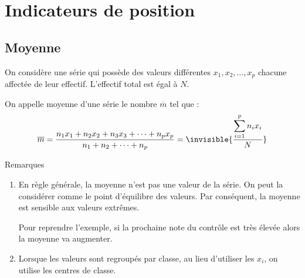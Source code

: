 \documentclass[xcolor={dvipsnames,svgnames,table}]{beamer}
\begin{document}
\section{Indicateurs de position}
\subsection{Moyenne}

\begin{frame}
    \begin{Definition}
        On considère une série qui possède des valeurs différentes $x_1, x_2, \ldots, x_p$ chacune affectée de leur effectif. L'effectif total est égal à $N$.\par
        On appelle \alert{moyenne} d'une série le nombre $\overline{m}$ tel que :
        \[\overline{m} = \frac{n_1x_1 + n_2x_2 + n_3x_3 + \cdots + n_px_p}{n_1 + n_2 + \cdots + n_p} = \invisible{\frac{\displaystyle\sum_{i =1}^{p}n_ix_i}{N}}\]
    \end{Definition}
\end{frame}

\begin{frame}
    \begin{Example}
    \end{Example}
\end{frame}

\begin{frame}{Remarques}
\pause
    \begin{enumerate}[<+->]
        \item En règle générale, la moyenne n'est pas une valeur de la série. On peut la considérer comme le \textnormal{point d'équilibre} des valeurs. Par conséquent, la moyenne est sensible aux valeurs extrêmes.\par
            Pour reprendre l'exemple, si la prochaine note du contrôle est très élevée alors la moyenne va augmenter.
        \item Lorsque les valeurs sont regroupés par classe, au lieu d'utiliser les $x_i$, on utilise les centres de classe.
    \end{enumerate}
\end{frame}
\end{document}
